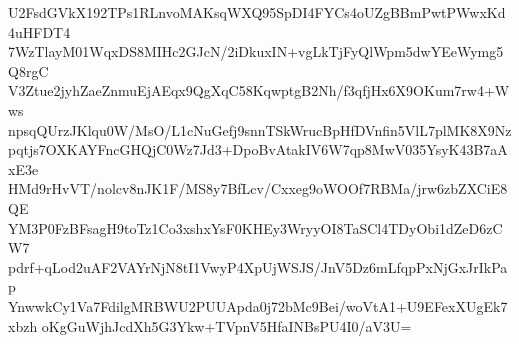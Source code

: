 U2FsdGVkX192TPs1RLnvoMAKsqWXQ95SpDI4FYCs4oUZgBBmPwtPWwxKd4uHFDT4
7WzTlayM01WqxDS8MIHc2GJcN/2iDkuxIN+vgLkTjFyQlWpm5dwYEeWymg5Q8rgC
V3Ztue2jyhZaeZnmuEjAEqx9QgXqC58KqwptgB2Nh/f3qfjHx6X9OKum7rw4+Wws
npsqQUrzJKlqu0W/MsO/L1cNuGefj9snnTSkWrucBpHfDVnfin5VlL7plMK8X9Nz
pqtjs7OXKAYFncGHQjC0Wz7Jd3+DpoBvAtakIV6W7qp8MwV035YsyK43B7aAxE3e
HMd9rHvVT/nolcv8nJK1F/MS8y7BfLcv/Cxxeg9oWOOf7RBMa/jrw6zbZXCiE8QE
YM3P0FzBFsagH9toTz1Co3xshxYsF0KHEy3WryyOI8TaSCl4TDyObi1dZeD6zCW7
pdrf+qLod2uAF2VAYrNjN8tI1VwyP4XpUjWSJS/JnV5Dz6mLfqpPxNjGxJrIkPap
YnwwkCy1Va7FdilgMRBWU2PUUApda0j72bMc9Bei/woVtA1+U9EFexXUgEk7xbzh
oKgGuWjhJcdXh5G3Ykw+TVpnV5HfaINBsPU4I0/aV3U=
